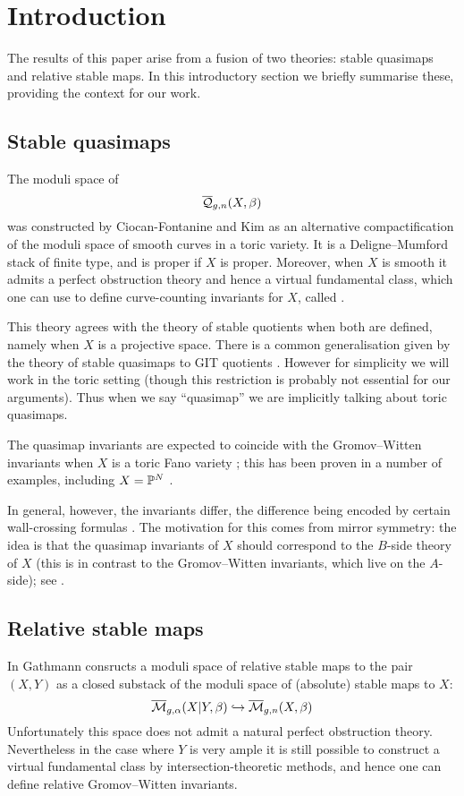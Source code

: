 \section{Introduction}
The results of this paper arise from a fusion of two theories: stable quasimaps and relative stable maps. In this introductory section we briefly summarise these, providing the context for our work.

\subsection{Stable quasimaps}
The moduli space of 
\begin{equation*} \overline{\mathcal Q}_{g,n}(X,\beta) \end{equation*}
was constructed by Ciocan-Fontanine and Kim \cite{CF-K} as an alternative compactification of the moduli space of smooth curves in a toric variety. It is a Deligne--Mumford stack of finite type, and is proper if $X$ is proper. Moreover, when $X$ is smooth it admits a perfect obstruction theory and hence a virtual fundamental class, which one can use to define curve-counting invariants for $X$, called .

This theory agrees with the theory of stable quotients \cite{MOP} when both are defined, namely when $X$ is a projective space.  There is a common generalisation given by the theory of stable quasimaps to GIT quotients \cite{CFKM}. However for simplicity we will work in the toric setting (though this restriction is probably not essential for our arguments). Thus when we say ``quasimap'' we are implicitly talking about toric quasimaps.

The quasimap invariants are expected to coincide with the Gromov--Witten invariants when $X$ is a toric Fano variety \cite{CM}; this has been proven in a number of examples, including $X=\mathbb P^N$ \cite[\S 5.4]{Manolache-Push}.

In general, however, the invariants differ, the difference being encoded by certain wall-crossing formulas \cite{CF-K-wallcrossing}. The motivation for this comes from mirror symmetry: the idea is that the quasimap invariants of $X$ should correspond to the $B$-side theory of $X$ (this is in contrast to the Gromov--Witten invariants, which live on the $A$-side); see \cite[\S 7]{CF-K}.

\subsection{Relative stable maps}
In \cite{Ga} Gathmann consructs a moduli space of relative stable maps to the pair $(X,Y)$ as a closed substack of the moduli space of (absolute) stable maps to $X$:
\begin{equation*} \overline{\mathcal M}_{g,\alpha}(X|Y,\beta) \hookrightarrow \overline{\mathcal M}_{g,n}(X,\beta) \end{equation*}
Unfortunately this space does not admit a natural perfect obstruction theory. Nevertheless in the case where $Y$ is very ample it is still possible to construct a virtual fundamental class by intersection-theoretic methods, and hence one can define relative Gromov--Witten invariants.

